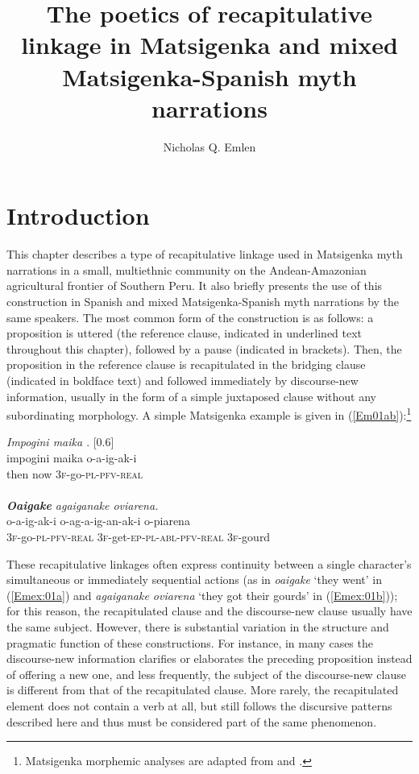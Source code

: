 \documentclass[output=paper]{LSP/langsci}
\author{
   Nicholas Q. Emlen\affiliation{John Carter Brown Library, Brown University}
}
\title{The poetics of recapitulative linkage in Matsigenka and mixed Matsigenka-Spanish myth narrations}
\begin{document}
\section{Introduction} 
\label{EmIntroduction}
This chapter describes a type of recapitulative linkage used in Matsigenka myth narrations in a small, multiethnic community on the Andean-Amazonian agricultural frontier of Southern Peru. It also briefly presents the use of this construction in Spanish and mixed Matsigenka-Spanish myth narrations by the same speakers. The most common form of the construction is as follows: a proposition is uttered (the reference clause, indicated in underlined text throughout this chapter), followed by a pause (indicated in brackets). Then, the proposition in the reference clause is recapitulated in the bridging clause (indicated in boldface text) and followed immediately by discourse-new information, usually in the form of a simple juxtaposed clause without any subordinating morphology. A simple Matsigenka example is given in (\ref{Em01ab}):\footnote{Matsigenka morphemic analyses are adapted from \citet{michael08} and \citet{vargas13}.}



%
\begin{exe}
\ex \label{Em01ab}
\begin{xlist}
\ex \label{Emex:01a}
\glt \textit{Impogini maika \underline{}}. [0.6]\\
\gll impogini maika o-a-ig-ak-i \\
 then now \textsc{3f-}go\textsc{-pl}-\textsc{pfv}-\textsc{real}\\
\glt {}\\
\ex \label{Emex:01b}
\glt \textit{\textbf{Oaigake} agaiganake oviarena.}\\
\gll o-a-ig-ak-i o-ag-a-ig-an-ak-i o-piarena\\     	      
   \textsc{3f-}go\textsc{-pl}-\textsc{pfv-}\textsc{real} \textsc{3f-}get\textsc{-ep-}\textsc{pl}-\textsc{abl-}\textsc{pfv}-\textsc{real} \textsc{3f-}gourd\\
\glt {}
\end{xlist}
\end{exe}



These recapitulative linkages often express continuity between a single character’s simultaneous or immediately sequential actions (as in \textit{oaigake} `they went' in (\ref{Emex:01a}) and \textit{agaiganake oviarena} `they got their gourds' in (\ref{Emex:01b})); for this reason, the recapitulated clause and the discourse-new clause usually have the same subject. However, there is substantial variation in the structure and pragmatic function of these constructions. For instance, in many cases the discourse-new information clarifies or elaborates the preceding proposition instead of offering a new one, and less frequently, the subject of the discourse-new clause is different from that of the recapitulated clause. More rarely, the recapitulated element does not contain a verb at all, but still follows the discursive patterns described here and thus must be considered part of the same phenomenon.
\end{document}
